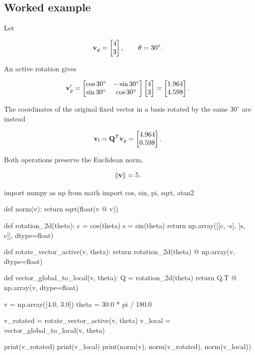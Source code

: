 \subsection{Worked example}

Let

\begin{equation}
    \mathbf{v}_g=
    \begin{bmatrix}4\\3\end{bmatrix},
    \qquad
    \theta=30^\circ.
\end{equation}

An active rotation gives

\begin{equation}
    \mathbf{v}'_g
    =
    \begin{bmatrix}
        \cos30^\circ&-\sin30^\circ\\
        \sin30^\circ& \cos30^\circ
    \end{bmatrix}
    \begin{bmatrix}4\\3\end{bmatrix}
    =
    \begin{bmatrix}
        1.964\\4.598
    \end{bmatrix}.
\end{equation}

The coordinates of the original fixed vector in a basis rotated by the same
$30^\circ$ are instead

\begin{equation}
    \mathbf{v}_l
    =\mathbf{Q}^{T}\mathbf{v}_g
    =
    \begin{bmatrix}
        4.964\\0.598
    \end{bmatrix}.
\end{equation}

Both operations preserve the Euclidean norm,

\begin{equation}
    \| {\mathbf{v}} \|=5.
\end{equation}

\begin{python}
import numpy as np
from math import cos, sin, pi, sqrt, atan2


def norm(v):
    return sqrt(float(v @ v))


def rotation_2d(theta):
    c = cos(theta)
    s = sin(theta)
    return np.array([[c, -s],
                     [s,  c]], dtype=float)


def rotate_vector_active(v, theta):
    return rotation_2d(theta) @ np.array(v, dtype=float)


def vector_global_to_local(v, theta):
    Q = rotation_2d(theta)
    return Q.T @ np.array(v, dtype=float)


v = np.array([4.0, 3.0])
theta = 30.0 * pi / 180.0

v_rotated = rotate_vector_active(v, theta)
v_local = vector_global_to_local(v, theta)

print(v_rotated)
print(v_local)
print(norm(v), norm(v_rotated), norm(v_local))
\end{python}

